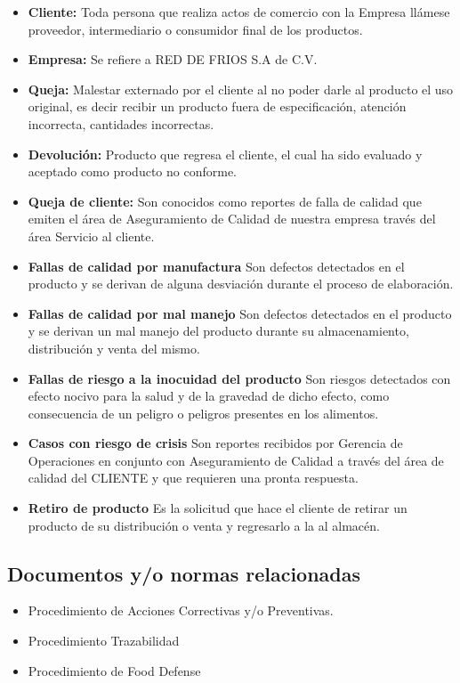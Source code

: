 \begin{itemize}
	\item \textbf{Cliente:} Toda persona que realiza actos de comercio con la Empresa llámese proveedor, intermediario o consumidor final de los productos.
	\item \textbf{Empresa:} Se refiere a RED DE FRIOS S.A de C.V.
	\item \textbf{Queja:} Malestar externado por el cliente al no poder darle al producto el uso original, es decir recibir un producto fuera de especificación, atención incorrecta, cantidades incorrectas.
	\item \textbf{Devolución:} Producto que regresa el cliente, el cual ha sido evaluado y aceptado como producto no conforme.
	\item \textbf{Queja de cliente:} Son conocidos como reportes de falla de calidad que emiten el área de Aseguramiento de Calidad de nuestra empresa través del área Servicio al cliente.
	\item \textbf{Fallas de calidad por manufactura} Son defectos detectados en el producto y se derivan de alguna desviación durante el proceso de elaboración.
	\item \textbf{Fallas de calidad por mal manejo} Son defectos detectados en el producto y se derivan un mal manejo del producto durante su almacenamiento, distribución y venta del mismo.
	\item \textbf{Fallas de riesgo a la inocuidad del producto} Son riesgos detectados con efecto nocivo para la salud y de la gravedad de dicho efecto, como consecuencia de un peligro o peligros presentes en los alimentos.
	\item \textbf{Casos con riesgo de crisis} Son reportes recibidos por Gerencia de Operaciones en conjunto con Aseguramiento de Calidad a través del área de calidad del CLIENTE y que requieren una pronta respuesta.
	\item \textbf{Retiro de producto} Es la solicitud que hace el cliente de retirar un producto de su distribución o venta y regresarlo a la al almacén.
\end{itemize}

\subsection{Documentos y/o normas relacionadas}

\begin{itemize}
	\item Procedimiento de Acciones Correctivas y/o Preventivas.
	\item Procedimiento Trazabilidad
	\item Procedimiento de Food Defense
\end{itemize}

